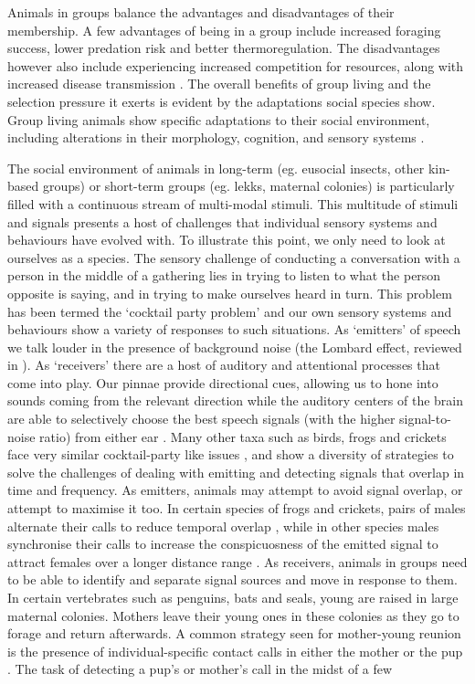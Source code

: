 \documentclass[
]{book}
\begin{document}
Animals in groups balance the advantages and disadvantages of their membership. A few advantages of being in a group include increased foraging success, lower predation risk and better thermoregulation. The disadvantages however also include experiencing increased competition for resources, along with increased disease transmission \citep{davies2012introduction}. The overall benefits of group living and the selection pressure it exerts is evident by the adaptations social species show. Group living animals show specific adaptations to their social environment, including alterations in their morphology, cognition, and sensory systems \citep{wilson2000sociobiology, ward2016sociality}.

The social environment of animals in long-term (eg. eusocial insects, other kin-based groups) or short-term groups (eg. lekks, maternal colonies) is particularly filled with a continuous stream of multi-modal stimuli. This multitude of stimuli and signals presents a host of challenges that individual sensory systems and behaviours have evolved with. To illustrate this point, we only need to look at ourselves as a species. The sensory challenge of conducting a conversation with a person in the middle of a gathering lies in trying to listen to what the person opposite is saying, and in trying to make ourselves heard in turn. This problem has been termed the `cocktail party problem' \citep{cherry1953a} and our own sensory systems and behaviours show a variety of responses to such situations. As `emitters' of speech we talk louder in the presence of background noise (the Lombard effect, reviewed in \citet{zollinger2011lombard}). As `receivers' there are a host of auditory and attentional processes that come into play. Our pinnae provide directional cues, allowing us to hone into sounds coming from the relevant direction \citep{yost2007a} while the auditory centers of the brain are able to selectively choose the best speech signals (with the higher signal-to-noise ratio) from either ear \citep{brungart2012better, Culling2017}. Many other taxa such as birds, frogs and crickets face very similar cocktail-party like issues \citep{bee2008a, brumm2005a}, and show a diversity of strategies to solve the challenges of dealing with emitting and detecting signals that overlap in time and frequency. As emitters, animals may attempt to avoid signal overlap, or attempt to maximise it too. In certain species of frogs and crickets, pairs of males alternate their calls to reduce temporal overlap \citep{bee2008a, hartbauer2016rhythm}, while in other species males synchronise their calls to increase the conspicuosness of the emitted signal to attract females over a longer distance range \citep{greenfield2015signal}. As receivers, animals in groups need to be able to identify and separate signal sources and move in response to them. In certain vertebrates such as penguins, bats and seals, young are raised in large maternal colonies. Mothers leave their young ones in these colonies as they go to forage and return afterwards. A common strategy seen for mother-young reunion is the presence of individual-specific contact calls in either the mother or the pup \citep{bradbury1998principles}. The task of detecting a pup's or mother's call in the midst of a few 
\end{document}
